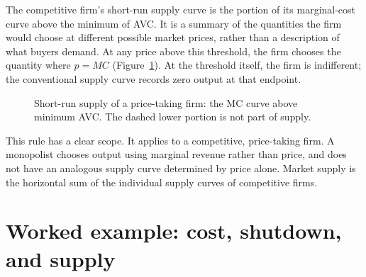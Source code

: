 The competitive firm's short-run supply curve is the portion of its
marginal-cost curve above the minimum of AVC. It is a summary of the
quantities the firm would choose at different possible market prices, rather
than a description of what buyers demand. At any price above this threshold,
the firm chooses the quantity where $p=MC$
(Figure~\ref{fig:firm-supply}). At the threshold itself, the firm is
indifferent; the conventional supply curve records zero output at that
endpoint.

\begin{figure}[htbp]
  \centering
  \caption{Short-run supply of a price-taking firm: the MC curve above
  minimum AVC. The dashed lower portion is not part of supply.}
  \label{fig:firm-supply}
\end{figure}
\FloatBarrier

This rule has a clear scope. It applies to a competitive, price-taking firm.
A monopolist chooses output using marginal revenue rather than price, and does
not have an analogous supply curve determined by price alone. Market supply is
the horizontal sum of the individual supply curves of competitive firms.

\section{Worked example: cost, shutdown, and supply}

